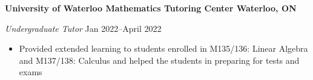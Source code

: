 \textbf{University of Waterloo Mathematics Tutoring Center \hfill Waterloo, ON}\par
\textit{Undergraduate Tutor} \hfill Jan 2022--April 2022

\begin{itemize}
    \item Provided extended learning to students enrolled in M135/136: Linear Algebra and M137/138: Calculus and helped the students in preparing for tests and exams
\end{itemize}
\vspace{0.1cm} \par
